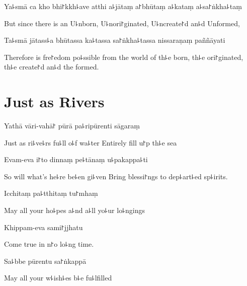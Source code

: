 Ya꜕smā ca kho bhi꜓kkh꜕ave atthi a꜕jātaṃ a꜓bhūtaṃ a꜕kataṃ a꜕sa꜓ṅkha꜕taṃ

\begin{english}
  But since there is an U꜕nborn, U꜕nori꜓ginated, U꜕ncreate꜓d an꜕d Unformed,
\end{english}

Ta꜕smā jātass꜕a bhūtassa ka꜕tassa sa꜓ṅkha꜕tassa nissaraṇaṃ paññāyati

\begin{english}
  Therefore is fre꜓edom po꜕ssible from the world of th꜕e born, th꜕e ori꜓ginated, th꜕e create꜓d an꜕d the formed.
\end{english}


\chapter{Just as Rivers}%



Yathā vāri-vahā꜓ pūrā pa꜕ripūrenti sāgaraṃ

\begin{english}
  Just as ri꜕ve꜕rs fu꜕ll o꜕f wa꜕ter Entirely fill u꜓p th꜕e sea
\end{english}

Evam-eva i꜓to dinnaṃ pe꜕tānaṃ u꜕pakappa꜕ti

\begin{english}
  So will what's he꜕re be꜕en gi꜕ven Bring blessi꜓ngs to dep꜕art꜕ed sp꜕irits.
\end{english}

Icchitaṃ pa꜕tthitaṃ tu꜓mhaṃ

\begin{english}
  May all your ho꜕pes a꜕nd a꜕ll yo꜕ur lo꜕ngings
\end{english}

Khippam-eva sami꜓jjhatu

\begin{english}
  Come true in n꜓o lo꜕ng time.
\end{english}

Sa꜕bbe pūrentu sa꜓ṅkappā

\begin{english}
  May all your w꜕ish꜕es b꜕e fu꜕lfilled
\end{english}

